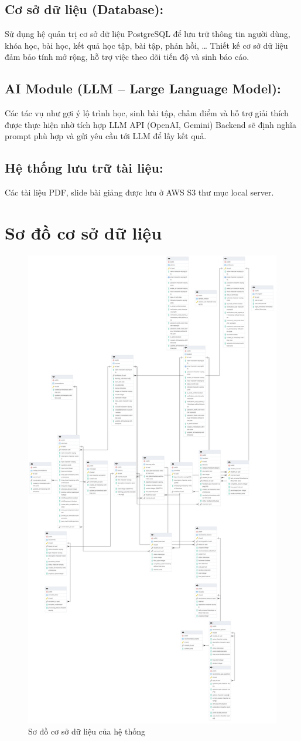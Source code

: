 \subsection{Cơ sở dữ liệu (Database):}
Sử dụng hệ quản trị cơ sở dữ liệu PostgreSQL để lưu trữ thông tin người dùng, khóa học, bài học, kết quả học tập, bài tập, phản hồi, \dots
Thiết kế cơ sở dữ liệu đảm bảo tính mở rộng, hỗ trợ việc theo dõi tiến độ và sinh báo cáo.

\subsection{AI Module (LLM – Large Language Model):}
Các tác vụ như gợi ý lộ trình học, sinh bài tập, chấm điểm và hỗ trợ giải thích được thực hiện nhờ tích hợp LLM API (OpenAI, Gemini)
Backend sẽ định nghĩa prompt phù hợp và gửi yêu cầu tới LLM để lấy kết quả.

\subsection{Hệ thống lưu trữ tài liệu:}
Các tài liệu PDF, slide bài giảng được lưu ở AWS S3 thư mục local server.

\section{Sơ đồ cơ sở dữ liệu}
\begin{figure}[H]
    \centering
    \includegraphics[width=0.6\linewidth]{images/ERD.png}
    \caption{Sơ đồ cơ sở dữ liệu của hệ thống}
    \label{fig:enter-label}
\end{figure}

